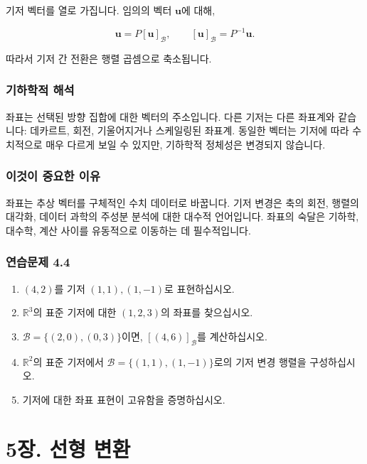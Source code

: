 \documentclass[
  12pt,
  a4paper,
]{article}
\let\oldsection\section
\renewcommand{\section}{\clearpage\oldsection}
\begin{document}
기저 벡터를 열로 가집니다. 임의의 벡터 \(\mathbf{u}\)에 대해,

\[\mathbf{u} = P [\mathbf{u}]_{\mathcal{B}}, \qquad [\mathbf{u}]_{\mathcal{B}} = P^{-1}\mathbf{u}.\]

따라서 기저 간 전환은 행렬 곱셈으로 축소됩니다.

\subsubsection{기하학적 해석}\label{geometric-interpretation-7}

좌표는 선택된 방향 집합에 대한 벡터의 주소입니다. 다른 기저는 다른 좌표계와 같습니다: 데카르트, 회전, 기울어지거나 스케일링된 좌표계. 동일한 벡터는 기저에 따라 수치적으로 매우 다르게 보일 수 있지만, 기하학적 정체성은 변경되지 않습니다.

\subsubsection{이것이 중요한 이유}\label{why-this-matters-15}

좌표는 추상 벡터를 구체적인 수치 데이터로 바꿉니다. 기저 변경은 축의 회전, 행렬의 대각화, 데이터 과학의 주성분 분석에 대한 대수적 언어입니다. 좌표의 숙달은 기하학, 대수학, 계산 사이를 유동적으로 이동하는 데 필수적입니다.

\subsubsection{연습문제 4.4}\label{exercises-44}

\begin{enumerate}
\def\labelenumi{\arabic{enumi}.}
\item
  \((4,2)\)를 기저 \((1,1), (1,-1)\)로 표현하십시오.
\item
  \(\mathbb{R}^3\)의 표준 기저에 대한 \((1,2,3)\)의 좌표를 찾으십시오.
\item
  \(\mathcal{B} = \{(2,0), (0,3)\}\)이면, \([ (4,6) ]_{\mathcal{B}}\)를 계산하십시오.
\item
  \(\mathbb{R}^2\)의 표준 기저에서 \(\mathcal{B} = \{(1,1), (1,-1)\}\)로의 기저 변경 행렬을 구성하십시오.
\item
  기저에 대한 좌표 표현이 고유함을 증명하십시오.
\end{enumerate}

\section{5장. 선형 변환}\label{chapter-5-linear-transformations}
\end{document}
